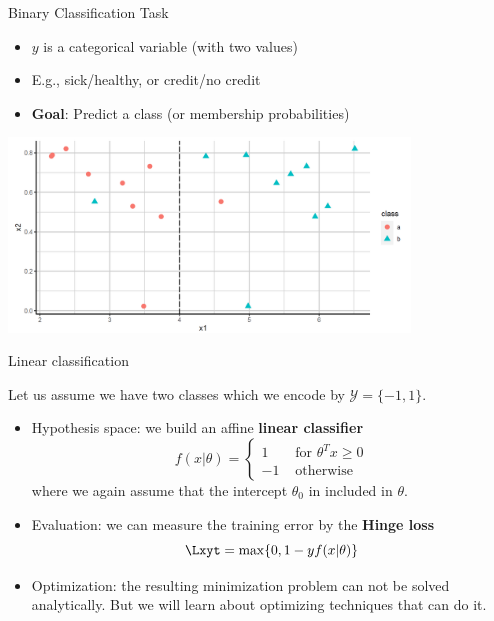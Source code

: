 \begin{frame}{Binary Classification Task}

\begin{itemize}
\item
  \(y\) is a categorical variable (with two values)
\item
  E.g., sick/healthy, or credit/no credit
\item
  \textbf{Goal}: Predict a class (or membership probabilities)
\end{itemize}

\scriptsize
\begin{center}
\includegraphics[width=0.8\textwidth]{plots/binary-class.png}
\end{center}

\normalsize 
\end{frame}


\begin{frame}{Linear classification}

Let us assume we have two classes which we encode by $\mathcal{Y}=\{-1,1\}$.
\begin{itemize}

\item Hypothesis space:
we build an affine \textbf{linear classifier}
$$
f(x | \theta)=
\begin{cases}
1 & \text{ for } \theta^T x \ge 0 \\
-1 & \text{ otherwise}
\end{cases}
$$
where we again assume that the intercept $\theta_{0}$ in included in $\theta$.
\pause 

\item Evaluation:
we can measure the training error by the \textbf{Hinge loss}
\begin{equation*}
\Lxyt =\max\{0, 1 - y f(x | \theta) \}
\end{equation*}
\pause

\item Optimization: the resulting minimization problem 
can not be solved analytically. But we will learn about optimizing techniques that can do it.

\end{itemize}
\end{frame}

